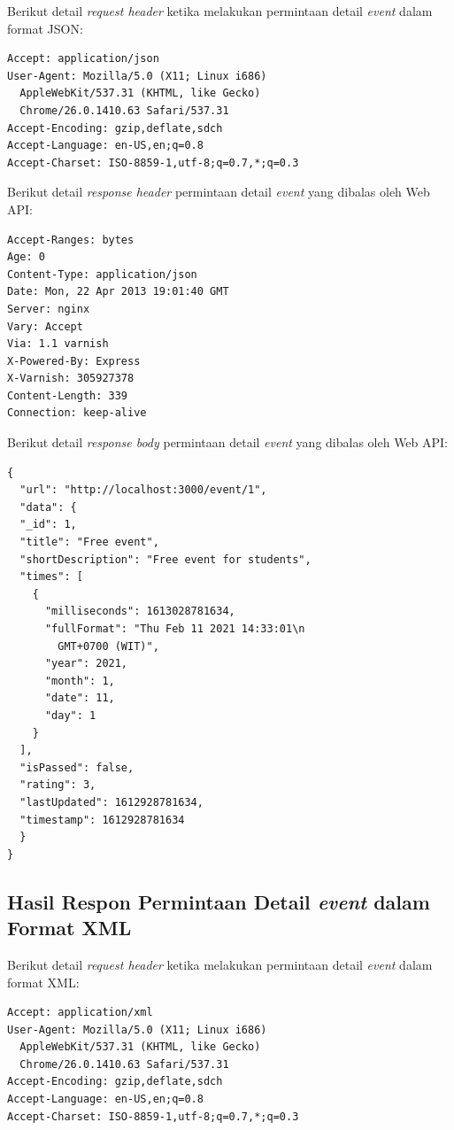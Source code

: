 \documentclass[a4paper, 12pt, oneside]{report}
\begin{document}
\onehalfspacing Berikut detail \textit{request header} ketika melakukan permintaan detail \textit{event} dalam format JSON:

\begin{lstlisting}[frame=single]
Accept: application/json
User-Agent: Mozilla/5.0 (X11; Linux i686)
  AppleWebKit/537.31 (KHTML, like Gecko)
  Chrome/26.0.1410.63 Safari/537.31
Accept-Encoding: gzip,deflate,sdch
Accept-Language: en-US,en;q=0.8
Accept-Charset: ISO-8859-1,utf-8;q=0.7,*;q=0.3
\end{lstlisting}

Berikut detail \textit{response header} permintaan detail \textit{event} yang dibalas oleh Web API:

\begin{lstlisting}[frame=single]
Accept-Ranges: bytes 
Age: 0 
Content-Type: application/json 
Date: Mon, 22 Apr 2013 19:01:40 GMT 
Server: nginx 
Vary: Accept 
Via: 1.1 varnish 
X-Powered-By: Express
X-Varnish: 305927378
Content-Length: 339 
Connection: keep-alive
\end{lstlisting}

Berikut detail \textit{response body} permintaan detail \textit{event} yang dibalas oleh Web API:

\begin{lstlisting}[frame=single]
{
  "url": "http://localhost:3000/event/1",
  "data": {
  "_id": 1,
  "title": "Free event",
  "shortDescription": "Free event for students",
  "times": [
    {
      "milliseconds": 1613028781634,
      "fullFormat": "Thu Feb 11 2021 14:33:01\n
        GMT+0700 (WIT)",
      "year": 2021,
      "month": 1,
      "date": 11,
      "day": 1
    }
  ],
  "isPassed": false,
  "rating": 3,
  "lastUpdated": 1612928781634,
  "timestamp": 1612928781634
  }
}
\end{lstlisting}

\subsection{Hasil Respon Permintaan Detail \textit{event} dalam Format XML}

Berikut detail \textit{request header} ketika melakukan permintaan detail \textit{event} dalam format XML:

\begin{lstlisting}[frame=single]
Accept: application/xml
User-Agent: Mozilla/5.0 (X11; Linux i686)
  AppleWebKit/537.31 (KHTML, like Gecko)
  Chrome/26.0.1410.63 Safari/537.31
Accept-Encoding: gzip,deflate,sdch
Accept-Language: en-US,en;q=0.8
Accept-Charset: ISO-8859-1,utf-8;q=0.7,*;q=0.3
\end{lstlisting}
\end{document}
